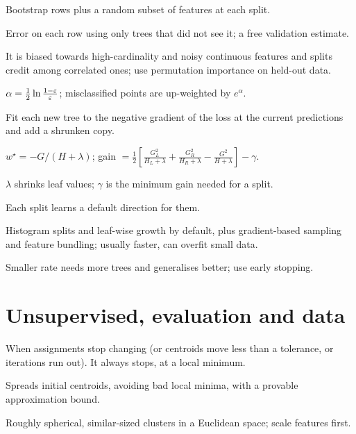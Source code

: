 {	 Bootstrap rows plus a random subset of features at each split.

	 Error on each row using only trees that did not see it; a free validation estimate.

	 It is biased towards high-cardinality and noisy continuous features and
	splits credit among correlated ones; use permutation importance on held-out data.

	 $\alpha=\frac12\ln\frac{1-\varepsilon}{\varepsilon}$; misclassified points are up-weighted by
	$e^{\alpha}$.

	 Fit each new tree to the negative gradient of the loss at the current
	predictions and add a shrunken copy.

	 $w^\star=-G/(H+\lambda)$; gain $=\frac12[\frac{G_L^2}{H_L+\lambda}+
	\frac{G_R^2}{H_R+\lambda}-\frac{G^2}{H+\lambda}]-\gamma$.

	 $\lambda$ shrinks leaf values; $\gamma$ is the minimum gain needed
	for a split.

	 Each split learns a default direction for them.

	 Histogram splits and leaf-wise growth by default, plus gradient-based sampling and
	feature bundling; usually faster, can overfit small data.

	 Smaller rate needs more trees and generalises better; use early stopping.

	\section{Unsupervised, evaluation and data}

	 When assignments stop changing (or centroids move less than a tolerance, or
	iterations run out). It always stops, at a local minimum.

	 Spreads initial centroids, avoiding bad local minima, with a provable approximation bound.

	 Roughly spherical, similar-sized clusters in a Euclidean space; scale features first.

}
